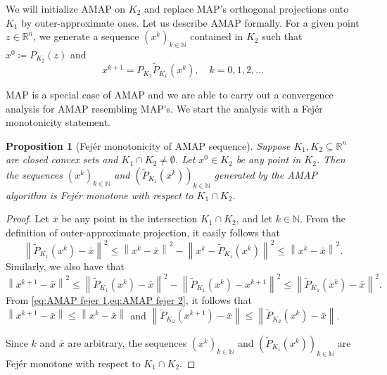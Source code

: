 \documentclass[smallextended,numbook,nospthms]{svjour3}
\theoremstyle{plain}
\newtheorem{proposition}[theorem]{Proposition}
\theoremstyle{definition}
\def\RR{\mathds R}
\def\NN{\mathds N}
\begin{document}
We will initialize AMAP on $K_{2}$ and replace MAP's orthogonal projections onto $K_1$ by outer-approximate ones. Let us describe AMAP formally. For a given point $z \in \RR^{n}$, we generate a sequence $\left(x^{k}\right)_{k \in \NN}$ contained in $K_{2}$ such that $x^{0} \coloneqq P_{K_{2}}(z)$ and
$$
x^{k+1}=P_{K_{2}}\tilde{P}_{K_{1}}\left(x^{k}\right), \quad k=0,1,2, \ldots
$$

MAP is a special case of AMAP and we are able to carry out a convergence analysis for AMAP resembling MAP's. We start the analysis with a Fejér monotonicity statement.

\begin{proposition}[Fejér monotonicity of AMAP sequence]\label{prop:AMAP Fejer}
	Suppose $K_{1},K_{2} \subseteq \RR^{n}$ are closed convex sets and $K_{1} \cap K_{2} \neq \emptyset$. Let $x^{0} \in K_{2}$ be any point in $K_{2}$. Then the sequences $\left(x^{k}\right)_{k \in \NN}$ and $\left(\tilde{P}_{K_{1}}\left(x^{k}\right)\right)_{k \in \NN}$ generated by the AMAP algorithm is Fejér monotone with respect to $K_{1} \cap K_{2}$.
\end{proposition}
\begin{proof}
	Let $\bar{x}$ be any point in the intersection $K_{1} \cap K_{2}$, and let $k \in \NN$. From the definition of outer-approximate projection, it easily follows that
	\begin{equation}\label{eq:AMAP fejer 1}
		\left\|\tilde{P}_{K_{1}}\left(x^{k}\right)-\bar{x}\right\|^{2} \leq \left\|x^{k}-\bar{x}\right\|^{2} - \left\|x^{k}-\tilde{P}_{K_{1}}\left(x^{k}\right)\right\|^{2} \leq \left\|x^{k}-\bar{x}\right\|^{2}.
	\end{equation}
	Similarly, we also have that
	\begin{equation}\label{eq:AMAP fejer 2}
		\left\|x^{k+1}-\bar{x}\right\|^{2} \leq \left\|\tilde{P}_{K_{1}}\left(x^{k}\right)-\bar{x}\right\|^{2} - \left\|\tilde{P}_{K_{1}}\left(x^{k}\right)-x^{k+1}\right\|^{2} \leq \left\|\tilde{P}_{K_{1}}\left(x^{k}\right)-\bar{x}\right\|^{2}.
	\end{equation}
	From \cref{eq:AMAP fejer 1,eq:AMAP fejer 2}, it follows that $\left\|x^{k+1}-\bar{x}\right\| \leq \left\|x^{k}-\bar{x}\right\|$
	and $\left\|\tilde{P}_{K_{2}}\left(x^{k+1}\right)-\bar{x}\right\| \leq \left\|\tilde{P}_{K_{2}}\left(x^{k}\right)-\bar{x}\right\|$.

	Since $k$ and $\bar{x}$ are arbitrary, the sequences $\left(x^{k}\right)_{k \in \NN}$ and $\left(\tilde{P}_{K_{1}}\left(x^{k}\right)\right)_{k \in \NN}$ are Fejér monotone with respect to $K_1 \cap K_2$.
\end{proof}
\end{document}
